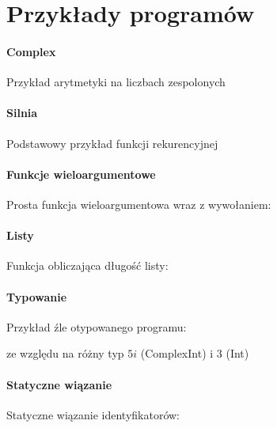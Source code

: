 \documentclass[12pt]{article}
\begin{document}
\section{Przykłady programów}

\paragraph{Complex}

Przykład arytmetyki na liczbach zespolonych



\paragraph{Silnia}

Podstawowy przykład funkcji rekurencyjnej



\paragraph{Funkcje wieloargumentowe}

Prosta funkcja wieloargumentowa wraz z wywołaniem:



\paragraph{Listy}

Funkcja obliczająca długość listy:



\paragraph{Typowanie}

Przykład źle otypowanego programu:



ze względu na różny typ $5i$ (ComplexInt) i $3$ (Int)

\paragraph{Statyczne wiązanie}

Statyczne wiązanie identyfikatorów:


\end{document}
